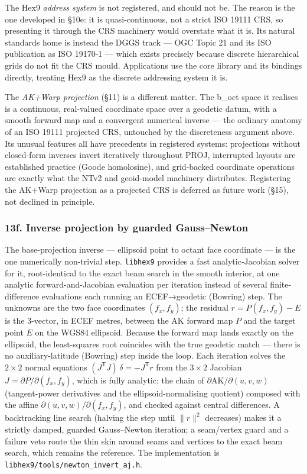 \documentclass[
  11pt,
  a4paper,
]{article}
\begin{document}
The Hex9 \emph{address system} is not registered, and should not be. The
reason is the one developed in §10e: it is quasi-continuous, not a
strict ISO 19111 CRS, so presenting it through the CRS machinery would
overstate what it is. Its natural standards home is instead the DGGS
track --- OGC Topic 21 and its ISO publication as ISO 19170-1 --- which
exists precisely because discrete hierarchical grids do not fit the CRS
mould. Applications use the core library and its bindings directly,
treating Hex9 as the discrete addressing system it is.

The \emph{AK+Warp projection} (§11) is a different matter. The b\_oct
space it realises is a continuous, real-valued coordinate space over a
geodetic datum, with a smooth forward map and a convergent numerical
inverse --- the ordinary anatomy of an ISO 19111 projected CRS,
untouched by the discreteness argument above. Its unusual features all
have precedents in registered systems: projections without closed-form
inverses invert iteratively throughout PROJ, interrupted layouts are
established practice (Goode homolosine), and grid-backed coordinate
operations are exactly what the NTv2 and geoid-model machinery
distributes. Registering the AK+Warp projection as a projected CRS is
deferred as future work (§15), not declined in principle.

\subsubsection{13f. Inverse projection by guarded
Gauss--Newton}\label{f.-inverse-projection-by-guarded-gaussnewton}

The base-projection inverse --- ellipsoid point to octant face
coordinate --- is the one numerically non-trivial step. \texttt{libhex9}
provides a fast analytic-Jacobian solver for it, root-identical to the
exact beam search in the smooth interior, at one analytic
forward-and-Jacobian evaluation per iteration instead of several
finite-difference evaluations each running an ECEF→geodetic (Bowring)
step. The unknowns are the two face coordinates \((f_x, f_y)\); the
residual \(r = P(f_x, f_y) - E\) is the 3-vector, in ECEF metres,
between the AK forward map \(P\) and the target point \(E\) on the WGS84
ellipsoid. Because the forward map lands exactly on the ellipsoid, the
least-squares root coincides with the true geodetic match --- there is
no auxiliary-latitude (Bowring) step inside the loop. Each iteration
solves the \(2\times2\) normal equations \((J^{\mathsf{T}}J)\,\delta =
-J^{\mathsf{T}} r\) from the \(3\times2\) Jacobian
\(J = \partial P/\partial(f_x,f_y)\), which is fully analytic: the chain
of \(\partial\mathrm{AK}/\partial(u,v,w)\) (tangent-power derivatives
and the ellipsoid-normalising quotient) composed with the affine
\(\partial(u,v,w)/\partial(f_x,f_y)\), and checked against central
differences. A backtracking line search (halving the step until
\(\lVert r
\rVert^2\) decreases) makes it a strictly damped, guarded Gauss--Newton
iteration; a seam/vertex guard and a failure veto route the thin skin
around seams and vertices to the exact beam search, which remains the
reference. The implementation is
\texttt{libhex9/tools/newton\_invert\_aj.h}.
\end{document}
